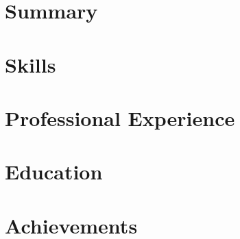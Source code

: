 \documentclass[letterpaper]{article}
\begin{document}


\section{Summary}


\section{Skills}


\section{Professional Experience}


\section{Education}


\section{Achievements}

\end{document}

